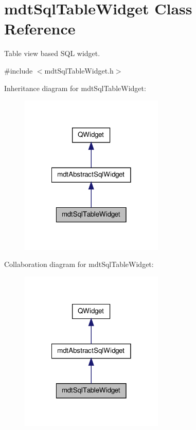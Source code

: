\hypertarget{classmdt_sql_table_widget}{\section{mdt\-Sql\-Table\-Widget Class Reference}
\label{classmdt_sql_table_widget}
}


Table view based S\-Q\-L widget.  




{\ttfamily \#include $<$mdt\-Sql\-Table\-Widget.\-h$>$}



Inheritance diagram for mdt\-Sql\-Table\-Widget\-:\nopagebreak
\begin{figure}[H]
\begin{center}
\leavevmode
\includegraphics[width=194pt]{classmdt_sql_table_widget__inherit__graph}
\end{center}
\end{figure}


Collaboration diagram for mdt\-Sql\-Table\-Widget\-:\nopagebreak
\begin{figure}[H]
\begin{center}
\leavevmode
\includegraphics[width=194pt]{classmdt_sql_table_widget__coll__graph}
\end{center}
\end{figure}
